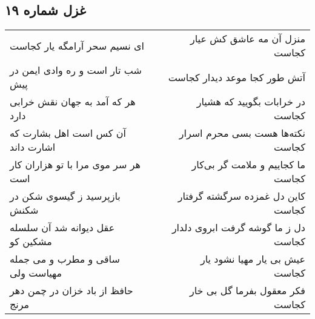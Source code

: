 \begin{center}
\section*{غزل شماره ۱۹}
\label{sec:sh019}
\begin{longtable}{l p{0.5cm} r}
ای نسیم سحر آرامگه یار کجاست
&&
منزل آن مه عاشق کش عیار کجاست
\\
شب تار است و ره وادی ایمن در پیش
&&
آتش طور کجا موعد دیدار کجاست
\\
هر که آمد به جهان نقش خرابی دارد
&&
در خرابات بگویید که هشیار کجاست
\\
آن کس است اهل بشارت که اشارت داند
&&
نکته‌ها هست بسی محرم اسرار کجاست
\\
هر سر موی مرا با تو هزاران کار است
&&
ما کجاییم و ملامت گر بی‌کار کجاست
\\
بازپرسید ز گیسوی شکن در شکنش
&&
کاین دل غمزده سرگشته گرفتار کجاست
\\
عقل دیوانه شد آن سلسله مشکین کو
&&
دل ز ما گوشه گرفت ابروی دلدار کجاست
\\
ساقی و مطرب و می جمله مهیاست ولی
&&
عیش بی یار مهیا نشود یار کجاست
\\
حافظ از باد خزان در چمن دهر مرنج
&&
فکر معقول بفرما گل بی خار کجاست
\\
\end{longtable}
\end{center}
